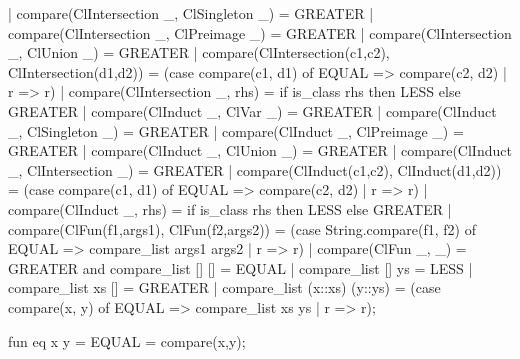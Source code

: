   | compare(ClIntersection _, ClSingleton _) = GREATER
  | compare(ClIntersection _, ClPreimage _) = GREATER
  | compare(ClIntersection _, ClUnion _) = GREATER
  | compare(ClIntersection(c1,c2), ClIntersection(d1,d2)) =
     (case compare(c1, d1) of
       EQUAL => compare(c2, d2)
     | r => r)
  | compare(ClIntersection _, rhs) = if is_class rhs then LESS else GREATER
  | compare(ClInduct _, ClVar _) = GREATER
  | compare(ClInduct _, ClSingleton _) = GREATER
  | compare(ClInduct _, ClPreimage _) = GREATER
  | compare(ClInduct _, ClUnion _) = GREATER
  | compare(ClInduct _, ClIntersection _) = GREATER
  | compare(ClInduct(c1,c2), ClInduct(d1,d2)) =
     (case compare(c1, d1) of
       EQUAL => compare(c2, d2)
     | r => r)
  | compare(ClInduct _, rhs) = if is_class rhs then LESS else GREATER
  | compare(ClFun(f1,args1), ClFun(f2,args2)) = 
     (case String.compare(f1, f2) of
       EQUAL => compare_list args1  args2
     | r => r)
  | compare(ClFun _, _) = GREATER
and compare_list [] [] = EQUAL
  | compare_list [] ys = LESS
  | compare_list xs [] = GREATER
  | compare_list (x::xs) (y::ys) =
     (case compare(x, y) of
       EQUAL => compare_list xs ys
     | r => r);

fun eq x y = EQUAL = compare(x,y);
\eatline
{}\nwendcode{}\nwdocspar
\nwenddocs{}

